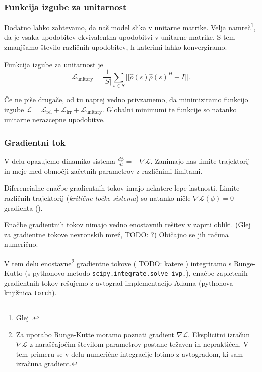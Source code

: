\documentclass[mat2, tisk]{fmfdelo}
\newcommand{\TODO}[1]{{\color{blue} TODO: #1}}
\newcommand{\loss }{\mathcal L}
\newcommand{\Loss}[1]{\mathcal L _\text{#1}}
\begin{document}
      \subsubsection{Funkcija izgube za unitarnost}
      Dodatno lahko zahtevamo, da naš model slika v unitarne matrike.
      Velja namreč\footnote{Glej \cite[trditev
      3.34]{jezernik2025upodobitve}.}, da je vsaka upodobitev
      ekvivalentna upodobitvi v unitarne matrike.
      S tem zmanjšamo število različnih upodobitev, h katerimi lahko
      konvergiramo.
      \begin{definicija}
        Funkcija izgube za unitarnost je
        \begin{equation}
          \label{eq: unitary loss}
          \Loss{unitary} = \frac{1}{|S|} \sum \limits_{s \in S}
          ||\hat\rho(s) \hat\rho(s)^H - I||.
        \end{equation}
      \end{definicija}
      Če ne piše drugače, od tu naprej vedno privzamemo, da
      minimiziramo funkcijo izgube $\loss = \Loss{rel} + \Loss{irr} +
      \Loss{unitary}$. Globalni minimumi te funkcije so natanko
      unitarne nerazcepne upodobitve.
      \subsubsection{Gradientni tok}
      V delu opazujemo dinamiko sistema $\frac{d\phi}{dt} = - \nabla
      \loss $. Zanimajo nas limite trajektorij in meje med območji
      začetnih parametrov z različnimi limitami.

      Diferencialne enačbe gradientnih tokov imajo nekatere lepe
      lastnosti. Limite različnih trajektorij (\emph{kritične točke
      sistema}) so natanko ničle $\nabla\loss(\phi) = 0$ gradienta
      (\cite[poglavje 9.3]{Hirsch2012dynamical-systems}).

      Enačbe gradientnih tokov nimajo vedno enostavnih  rešitev v
      zaprti obliki. (Glej
        \cite{park2024absenceclosedformdescriptionsgradient} za
      gradientne tokove nevronskih mrež, \TODO{?}) Običajno se jih
      računa numerično.

      V tem delu enostavne\footnote{Za uporabo Runge-Kutte moramo
        poznati gradient $\nabla \loss$. Eksplicitni izračun $\nabla
        \loss $ z naraščajočim številom parametrov postane težaven in
        nepraktičen. V tem primeru se v delu numerične integracije
      lotimo z avtogradom, ki sam izračuna gradient.}  gradientne
      tokove (\TODO{katere }) integriramo s Runge-Kutto (s pythonovo
      metodo  \verb|scipy.integrate.solve_ivp.|), enačbe zapletenih
      gradientnih tokov rešujemo z avtograd implementacijo Adama
      (pythonova knjižnica \verb|torch|).
\end{document}
